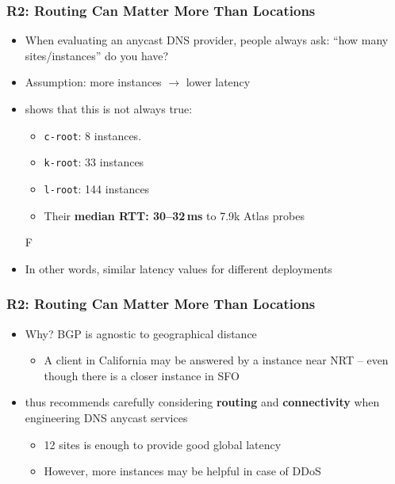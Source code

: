 \documentclass[11pt,show 
notes,notheorems,noamsthm,blank]{beamer} %
\begin{document}
\begin{frame}
 \frametitle{R2: Routing Can Matter More Than Locations}
 
 \begin{itemize}
  \item When evaluating an anycast DNS provider, people always ask:
       ``how many sites/instances'' do you have?
 \item Assumption: more instances $\rightarrow$ lower latency
 \item \cite{Schmidt17a} shows that this is not always true:
 
\begin{itemize}
 \item \texttt{c-root}: 8 instances. 
 \item \texttt{k-root}: 33 instances
 \item \texttt{l-root}: 144 instances
 \item Their\textbf{ median RTT: 30--32\,ms }to 7.9k Atlas probes

\end{itemize}F
 \item In other words, similar latency values for different deployments

 \end{itemize}

\end{frame}


\begin{frame}
 \frametitle{R2: Routing Can Matter More Than Locations}
 
\begin{itemize}
 \item Why? BGP is agnostic to geographical distance
 \begin{itemize}
  \item A client in California may be answered by a instance near NRT -- even 
though there is a closer instance in SFO
 \end{itemize}

\item \cite{Schmidt17a} thus recommends carefully considering
  \textbf{routing} and \textbf{connectivity} 
when engineering DNS anycast services

\begin{itemize}


 \item 12 sites is enough to provide good global latency 
 \item However, more instances may be helpful in case of DDoS~\cite{Moura16b}
\end{itemize}
\end{itemize}

\end{frame}
\end{document}
